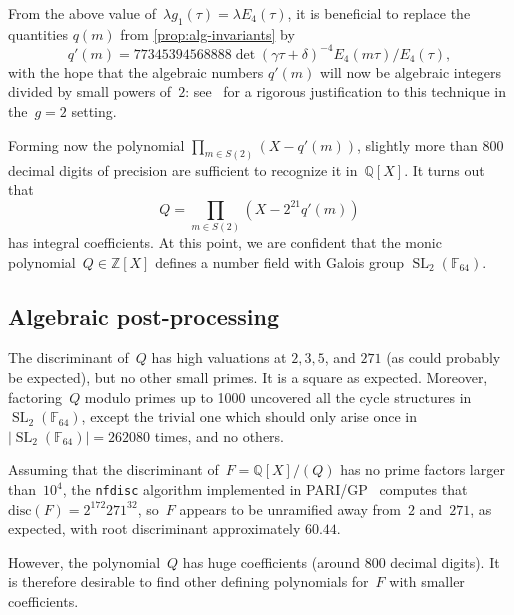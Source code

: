 \documentclass[12pt,oneside]{amsart}
\numberwithin{equation}{section}
\theoremstyle{definition}
\newcommand{\Z}{\mathbb{Z}}
\newcommand{\Q}{\mathbb{Q}}
\newcommand{\F}{\mathbb{F}}
\DeclareMathOperator{\SL}{SL}
\begin{document}
From the above value of~$\lambda g_1(\tau) = \lambda E_4(\tau)$, it is
beneficial to replace the quantities $q(m)$ from \cref{prop:alg-invariants} by
\begin{equation}
  \label{eq:qprime}
  q'(m) = 77345394568888 \det(\gamma\tau + \delta)^{-4} E_4(m\tau)/E_4(\tau),
\end{equation}
with the hope that the algebraic numbers $q'(m)$ will now be algebraic integers
divided by small powers of~$2$:
see~\cite[Thm.~4.11]{vanbommelComputingIsogenyClasses2024} for a rigorous
justification to this technique in the~$g=2$ setting.

Forming now the polynomial $\prod_{m\in S(2)} (X - q'(m))$, slightly more than
800 decimal digits of precision are sufficient to recognize it in~$\Q[X]$. It
turns out that
\begin{equation}
  Q = \prod_{m\in S(2)} (X - 2^{21} q'(m))
\end{equation}
has integral coefficients. At this point, we are confident that the monic
polynomial~$Q\in \Z[X]$ defines a number field with Galois group
$\SL_2(\F_{64})$.

\subsection{Algebraic post-processing}
\label{subsec:galois-check}

The discriminant of~$Q$ has high valuations at $2,3,5$, and $271$ (as could
probably be expected), but no other small primes. It is a square as expected.
Moreover, factoring~$Q$ modulo primes up to 1000 uncovered all the cycle
structures in $\SL_2(\F_{64})$, except the trivial one which should only arise
once in $|\SL_2(\F_{64})| = 262080$ times, and no others.

Assuming that the discriminant of~$F= \Q[X]/(Q) $ has no prime factors larger
than~$10^4$, the \texttt{nfdisc} algorithm implemented in
PARI/GP~\cite{theparigroupPariGPVersion2025} computes that
$\mathrm{disc}(F) = 2^{172} 271^{32}$, so~$F $ appears to be unramified away
from~$2$ and~$271$, as expected, with root discriminant approximately $60.44$.

However, the polynomial~$Q$ has huge coefficients (around 800 decimal
digits). It is therefore desirable to find other defining polynomials for~$F$
with smaller coefficients.
\end{document}
